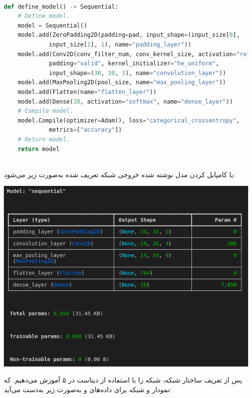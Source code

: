 	
\begin{latin}
\begin{lstlisting}[language=Python,caption={Model Definition}]
	
def define_model() -> Sequential:
	# Define model.
	model = Sequential()
	model.add(ZeroPadding2D(padding=pad, input_shape=(input_size[0],
			 input_size[1], 1), name="padding_layer"))
	model.add(Conv2D(conv_filter_num, conv_kernel_size, activation="relu",
			 padding="valid", kernel_initializer="he_uniform",
			 input_shape=(30, 30, 1), name="convolution_layer"))
	model.add(MaxPooling2D(pool_size, name="max_pooling_layer"))
	model.add(Flatten(name="flatten_layer"))
	model.add(Dense(10, activation="softmax", name="dense_layer"))
	# Compile model.
	model.Compile(optimizer=Adam(), loss="categorical_crossentropy",
			 metrics=["accuracy"])
	# Return model.
	return model
	
\end{lstlisting}
\end{latin}


\begin{qsolve}
	با کامپایل کردن مدل نوشته شده خروجی شبکه تعریف شده به‌صورت زیر می‌شود:
	
	\begin{center}
		\includegraphics*[width=0.7\linewidth]{pics/img3.png}
		\label{ساختار شبکه تعریف شده}
	\end{center}
	
	
	پس از تعریف ساختار شبکه، شبکه را با استفاده از دیتاست  در ۵  آموزش می‌دهیم. که نمودار  و  شبکه برای داده‌های  و  به‌صورت زیر به‌دست می‌آید:
	
\end{qsolve}

